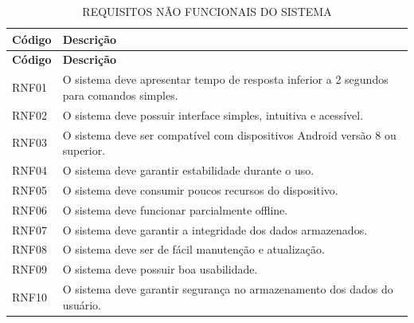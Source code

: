 \documentclass[12pt,oneside,a4paper,brazil,final]{abntex2}
\begin{document}
\begin{longtable}{|p{2.3cm}|p{12cm}|}

\caption{REQUISITOS NÃO FUNCIONAIS DO SISTEMA}

\label{tab:requisitos-nao-funcionais}\\

\hline

\textbf{Código} & \textbf{Descrição} \\

\hline

\endfirsthead



\hline

\textbf{Código} & \textbf{Descrição} \\

\hline

\endhead



RNF01 & O sistema deve apresentar tempo de resposta inferior a 2 segundos para comandos simples. \\

\hline

RNF02 & O sistema deve possuir interface simples, intuitiva e acessível. \\

\hline

RNF03 & O sistema deve ser compatível com dispositivos Android versão 8 ou superior. \\

\hline

RNF04 & O sistema deve garantir estabilidade durante o uso. \\

\hline

RNF05 & O sistema deve consumir poucos recursos do dispositivo. \\

\hline

RNF06 & O sistema deve funcionar parcialmente offline. \\

\hline

RNF07 & O sistema deve garantir a integridade dos dados armazenados. \\

\hline

RNF08 & O sistema deve ser de fácil manutenção e atualização. \\

\hline

RNF09 & O sistema deve possuir boa usabilidade. \\

\hline

RNF10 & O sistema deve garantir segurança no armazenamento dos dados do usuário. \\

\hline

\end{longtable}
\end{document}
